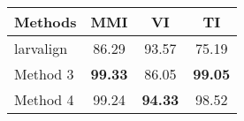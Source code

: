 \begin{tabular}{lccc}
\hline
 ﻿Methods  & MMI   & VI    & TI    \\ \hline \hline
 larvalign & 86.29 & 93.57 & 75.19 \\
 Method 3  & \textbf{99.33} & 86.05 & \textbf{99.05} \\
 Method 4  & 99.24 & \textbf{94.33} & 98.52 \\
\hline
\end{tabular}